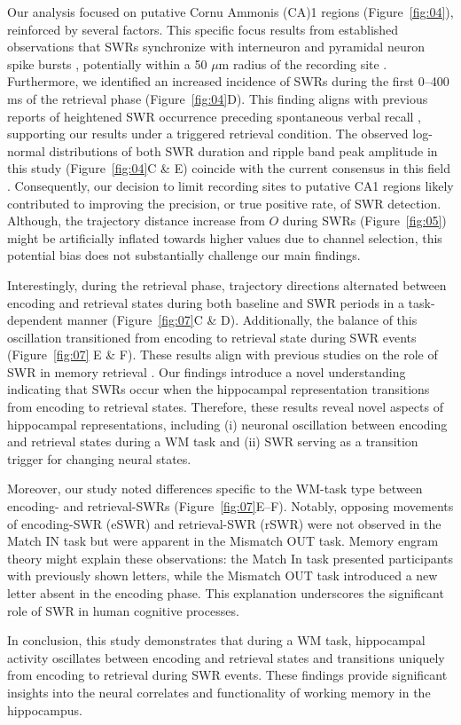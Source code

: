 Our analysis focused on putative Cornu Ammonis (CA)1 regions (Figure~\ref{fig:04}), reinforced by several factors. This specific focus results from established observations that SWRs synchronize with interneuron and pyramidal neuron spike bursts \cite{buzsaki_two-stage_1989} \cite{quyen_cell_2008} \cite{royer_control_2012} \cite{hajos_input-output_2013}, potentially within a 50 $\mu$m radius of the recording site \cite{schomburg_spiking_2012}. Furthermore, we identified an increased incidence of SWRs during the first 0--400 ms of the retrieval phase (Figure~\ref{fig:04}D). This finding aligns with previous reports of heightened SWR occurrence preceding spontaneous verbal recall \cite{norman_hippocampal_2019} \cite{norman_hippocampal_2021}, supporting our results under a triggered retrieval condition. The observed log-normal distributions of both SWR duration and ripple band peak amplitude in this study (Figure~\ref{fig:04}C \& E) coincide with the current consensus in this field \cite{liu_consensus_2022}. Consequently, our decision to limit recording sites to putative CA1 regions likely contributed to improving the precision, or true positive rate, of SWR detection. Although, the trajectory distance increase from $O$ during SWRs (Figure~\ref{fig:05}) might be artificially inflated towards higher values due to channel selection, this potential bias does not substantially challenge our main findings.

Interestingly, during the retrieval phase, trajectory directions alternated between encoding and retrieval states during both baseline and SWR periods in a task-dependent manner (Figure~\ref{fig:07}C \& D). Additionally, the balance of this oscillation transitioned from encoding to retrieval state during SWR events (Figure~\ref{fig:07} E \& F). These results align with previous studies on the role of SWR in memory retrieval \cite{norman_hippocampal_2019} \cite{norman_hippocampal_2021}. Our findings introduce a novel understanding indicating that SWRs occur when the hippocampal representation transitions from encoding to retrieval states. Therefore, these results reveal novel aspects of hippocampal representations, including (i) neuronal oscillation between encoding and retrieval states during a WM task and (ii) SWR serving as a transition trigger for changing neural states.

Moreover, our study noted differences specific to the WM-task type between encoding- and retrieval-SWRs (Figure~\ref{fig:07}E--F). Notably, opposing movements of encoding-SWR (eSWR) and retrieval-SWR (rSWR) were not observed in the Match IN task but were apparent in the Mismatch OUT task. Memory engram theory \cite{liu_optogenetic_2012} might explain these observations: the Match In task presented participants with previously shown letters, while the Mismatch OUT task introduced a new letter absent in the encoding phase. This explanation underscores the significant role of SWR in human cognitive processes.

In conclusion, this study demonstrates that during a WM task, hippocampal activity oscillates between encoding and retrieval states and transitions uniquely from encoding to retrieval during SWR events. These findings provide significant insights into the neural correlates and functionality of working memory in the hippocampus.
\label{sec:discussion}